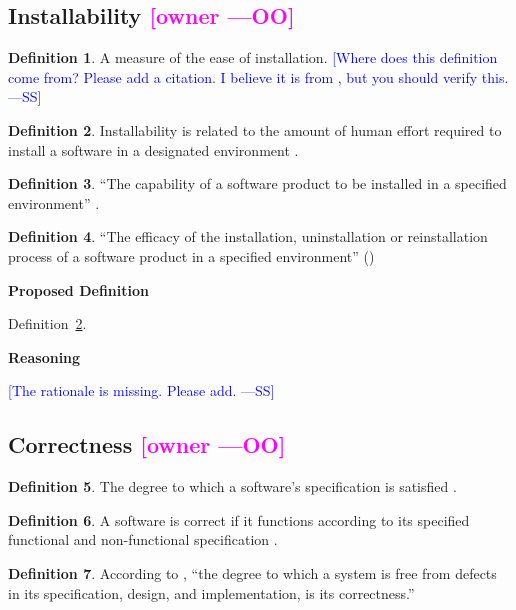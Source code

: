 \documentclass[letterpaper,cleveref]{lipics-v2019}
\newcommand{\authornote}[3]{\textcolor{#1}{[#3 ---#2]}}
\newcommand{\authornote}[3]{}
\newcommand{\wss}[1]{\authornote{blue}{SS}{#1}} %
\newcommand{\oo}[1]{\authornote{magenta}{OO}{#1}} %
\theoremstyle{definition}
\newtheorem{defn}{Definition}
\begin{document}
\subsection{Installability \oo{owner}}

\begin{defn}
  A measure of the ease of installation.  \wss{Where does this definition come
    from? Please add a citation.  I believe it is from \citet{McCallEtAl1977},
    but you should verify this.}
\end{defn}

\begin{defn} \label{DefnInstallability}
  Installability is related to the amount of human effort required to install a
  software in a designated environment \citep{berander2005software}.
\end{defn}

\begin{defn}
  ``The capability of a software product to be installed in a specified
  environment'' \citep{berander2005software}.
\end{defn}

\begin{defn}
  ``The efficacy of the installation, uninstallation or reinstallation process
  of a software product in a specified environment'' (\citep{iso201017043})
\end{defn}

\noindent \textbf{Proposed Definition}

Definition~\ref{DefnInstallability}.

\noindent \textbf{Reasoning}

\wss{The rationale is missing.  Please add.}

\subsection{Correctness \oo{owner}}

\begin{defn}
  The degree to which a software's specification is satisfied
  \citep{berander2005software}.
\end{defn}

\begin{defn} \label{CorrectDefnSelected} 
  A software is correct if it functions according to its specified functional
  and non-functional specification \citep{GhezziEtAl2003}.
\end{defn}

\begin{defn}
  According to \citet{wilson2009quality}, ``the degree to which a system is free
  from defects in its specification, design, and implementation, is its
  correctness.''
\end{defn}
\end{document}
